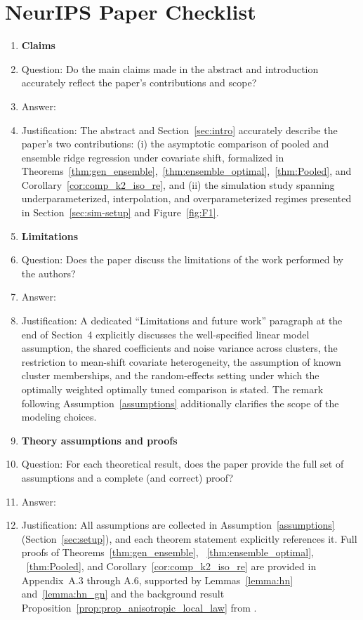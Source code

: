 \section*{NeurIPS Paper Checklist}

\begin{enumerate}

\item {\bf Claims}
    \item[] Question: Do the main claims made in the abstract and introduction accurately reflect the paper's contributions and scope?
    \item[] Answer: \answerYes{} %
    \item[] Justification: The abstract and Section~\ref{sec:intro} accurately describe the paper's two contributions: (i) the asymptotic comparison of pooled and ensemble ridge regression under covariate shift, formalized in Theorems~\ref{thm:gen_ensemble},~\ref{thm:ensemble_optimal},~\ref{thm:Pooled}, and Corollary~\ref{cor:comp_k2_iso_re}, and (ii) the simulation study spanning underparameterized, interpolation, and overparameterized regimes presented in Section~\ref{sec:sim-setup} and Figure~\ref{fig:F1}.
   

\item {\bf Limitations}
    \item[] Question: Does the paper discuss the limitations of the work performed by the authors?
    \item[] Answer: \answerYes{} %
    \item[] Justification: A dedicated ``Limitations and future work'' paragraph at the end of Section~4 explicitly discusses the well-specified linear model assumption, the shared coefficients and noise variance across clusters, the restriction to mean-shift covariate heterogeneity, the assumption of known cluster memberships, and the random-effects setting under which the optimally weighted optimally tuned comparison is stated. The remark following Assumption~\ref{assumptions} additionally clarifies the scope of the modeling choices.
    
\item {\bf Theory assumptions and proofs}
    \item[] Question: For each theoretical result, does the paper provide the full set of assumptions and a complete (and correct) proof?
    \item[] Answer: \answerYes{} %
    \item[] Justification: All assumptions are collected in Assumption~\ref{assumptions} (Section~\ref{sec:setup}), and each theorem statement explicitly references it. Full proofs of Theorems~\ref{thm:gen_ensemble}, ~\ref{thm:ensemble_optimal}, ~\ref{thm:Pooled}, and Corollary~\ref{cor:comp_k2_iso_re} are provided in Appendix~A.3 through A.6, supported by Lemmas~\ref{lemma:hn} and~\ref{lemma:hn_gn} and the background result Proposition~\ref{prop:prop_anisotropic_local_law} from \citet{knowles2017anisotropic}.
    

\end{enumerate}
